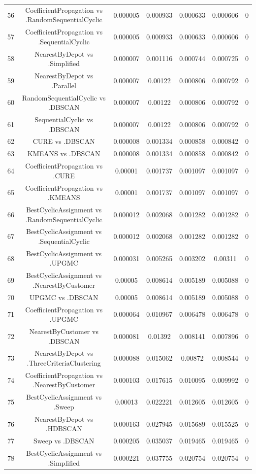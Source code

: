 \documentclass[a4paper,10pt]{article}
\begin{document}
\begin{landscape}
\begin{table}[!htp]
\begin{tabular}{ccccccc}
56&CoefficientPropagation vs .RandomSequentialCyclic&0.000005&0.000933&0.000633&0.000606&0\\
57&CoefficientPropagation vs .SequentialCyclic&0.000005&0.000933&0.000633&0.000606&0\\
58&NearestByDepot vs .Simplified&0.000007&0.001116&0.000744&0.000725&0\\
59&NearestByDepot vs .Parallel&0.000007&0.00122&0.000806&0.000792&0\\
60&RandomSequentialCyclic vs .DBSCAN&0.000007&0.00122&0.000806&0.000792&0\\
61&SequentialCyclic vs .DBSCAN&0.000007&0.00122&0.000806&0.000792&0\\
62&CURE vs .DBSCAN&0.000008&0.001334&0.000858&0.000842&0\\
63&KMEANS vs .DBSCAN&0.000008&0.001334&0.000858&0.000842&0\\
64&CoefficientPropagation vs .CURE&0.00001&0.001737&0.001097&0.001097&0\\
65&CoefficientPropagation vs .KMEANS&0.00001&0.001737&0.001097&0.001097&0\\
66&BestCyclicAssignment vs .RandomSequentialCyclic&0.000012&0.002068&0.001282&0.001282&0\\
67&BestCyclicAssignment vs .SequentialCyclic&0.000012&0.002068&0.001282&0.001282&0\\
68&BestCyclicAssignment vs .UPGMC&0.000031&0.005265&0.003202&0.00311&0\\
69&BestCyclicAssignment vs .NearestByCustomer&0.00005&0.008614&0.005189&0.005088&0\\
70&UPGMC vs .DBSCAN&0.00005&0.008614&0.005189&0.005088&0\\
71&CoefficientPropagation vs .UPGMC&0.000064&0.010967&0.006478&0.006478&0\\
72&NearestByCustomer vs .DBSCAN&0.000081&0.01392&0.008141&0.007896&0\\
73&NearestByDepot vs .ThreeCriteriaClustering&0.000088&0.015062&0.00872&0.008544&0\\
74&CoefficientPropagation vs .NearestByCustomer&0.000103&0.017615&0.010095&0.009992&0\\
75&BestCyclicAssignment vs .Sweep&0.00013&0.022221&0.012605&0.012605&0\\
76&NearestByDepot vs .HDBSCAN&0.000163&0.027945&0.015689&0.015525&0\\
77&Sweep vs .DBSCAN&0.000205&0.035037&0.019465&0.019465&0\\
78&BestCyclicAssignment vs .Simplified&0.000221&0.037755&0.020754&0.020754&0\\

\end{tabular}
\end{table}
\end{landscape}
\end{document}
